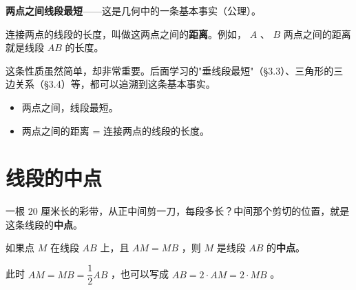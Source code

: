 \begin{understand}


\textbf{两点之间线段最短}——这是几何中的一条基本事实（公理）。

连接两点的线段的长度，叫做这两点之间的\textbf{距离}。例如， $A$ 、 $B$ 两点之间的距离就是线段 $AB$ 的长度。

这条性质虽然简单，却非常重要。后面学习的"垂线段最短"（§3.3）、三角形的三边关系（§3.4）等，都可以追溯到这条基本事实。

\end{understand}

\begin{keytakeaway}


\begin{itemize}
  \item 两点之间，线段最短。
  \item 两点之间的距离 = 连接两点的线段的长度。
\end{itemize}


\end{keytakeaway}



\section*{线段的中点}


\begin{explore}


一根 $20$ 厘米长的彩带，从正中间剪一刀，每段多长？中间那个剪切的位置，就是这条线段的\textbf{中点}。

\end{explore}

\begin{understand}


如果点 $M$ 在线段 $AB$ 上，且 $AM = MB$ ，则 $M$ 是线段 $AB$ 的\textbf{中点}。

此时 $AM = MB = \dfrac{1}{2} AB$ ，也可以写成 $AB = 2 \cdot AM = 2 \cdot MB$ 。

\begin{center}
\label{fig:midpoint}
\end{center}


\end{understand}

